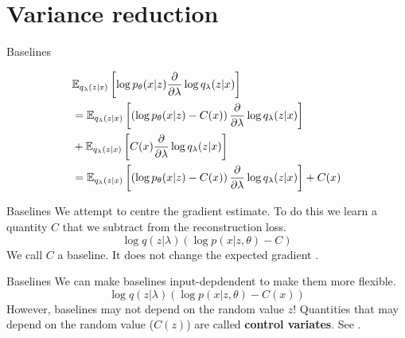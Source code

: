 \section{Variance reduction}


\begin{frame}{Baselines}

\begin{equation}
\begin{aligned}
&\mathbb E_{q_\lambda(z|x)} \left[  \log p_\theta(x|z)  \pdv{\lambda}\log q_\lambda(z|x)\right] \\
&= \mathbb E_{q_\lambda(z|x)} \left[ \left(  \log p_\theta(x|z) -C(x) \right)  \pdv{\lambda}\log q_\lambda(z|x) \right] \\
&+ \mathbb E_{q_\lambda(z|x)} \left[ C(x)\pdv{\lambda}\log q_\lambda(z|x)  \right]\\
&= \mathbb E_{q_\lambda(z|x)} \left[ \left(  \log p_\theta(x|z) -C(x) \right)  \pdv{\lambda}\log q_\lambda(z|x) \right] + C(x)
\end{aligned}
\end{equation}

\end{frame}


\begin{frame}{Baselines}
We attempt to centre the gradient estimate. To do this we learn a quantity $ C $ that we subtract
from the reconstruction loss.
\begin{equation*}
\log q(z|\lambda) \left( \log p(x|z,\theta) - C \right)
\end{equation*}
We call $ C $ a baseline. It does not change the expected gradient \citep{Williams:1992}.
\end{frame}

\begin{frame}{Baselines}
We can make baselines input-depdendent to make them more flexible.
\begin{equation*}
\log q(z|\lambda) \left( \log p(x|z,\theta) - C(x) \right)
\end{equation*}
However, baselines may not depend on the random value $ z $! Quantities that may depend on the
random value ($ C(z) $) are called \textbf{control variates}. See \cite{PaisleyEtAl:2012, RanganathEtAl:2014,GregorEtAl:2014}.
\end{frame}

